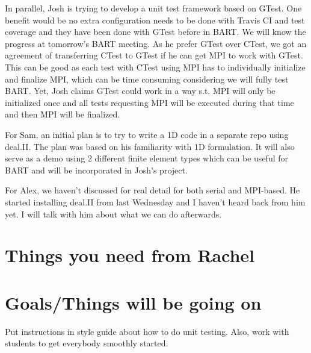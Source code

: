 \documentclass{article}
\begin{document}
In parallel, Josh is trying to develop a unit test framework based on GTest. One benefit would be 
no extra configuration needs to be done with Travis CI and test coverage and they have been 
done with GTest before in BART. We will know the progress at tomorrow's BART meeting. As he
prefer GTest over CTest, we got an agreement of transferring CTest to GTest if he can get MPI
to work with GTest. This can be good as each test with CTest using MPI has to individually
initialize and finalize MPI, which can be time consuming considering we will fully test BART. Yet,
Josh claims GTest could work in a way s.t. MPI will only be initialized once and all tests 
requesting MPI will be executed during that time and then MPI will be finalized.

For Sam, an initial plan is to try to write a 1D code in a separate repo using deal.II. The plan was based on his familiarity with 1D formulation. It will also serve as a demo using 2 different finite element types which can be useful for BART and will be incorporated in Josh's project.

For Alex, we haven't discussed for real detail for both serial and MPI-based. He started installing deal.II from last Wednesday and I haven't heard back from him yet. I will talk with him about what we can do afterwards.

\section{Things you need from Rachel}


\section{Goals/Things will be going on}
Put instructions in style guide about how to do unit testing. Also, work with students to get everybody smoothly started.





%
%
%

\end{document}
